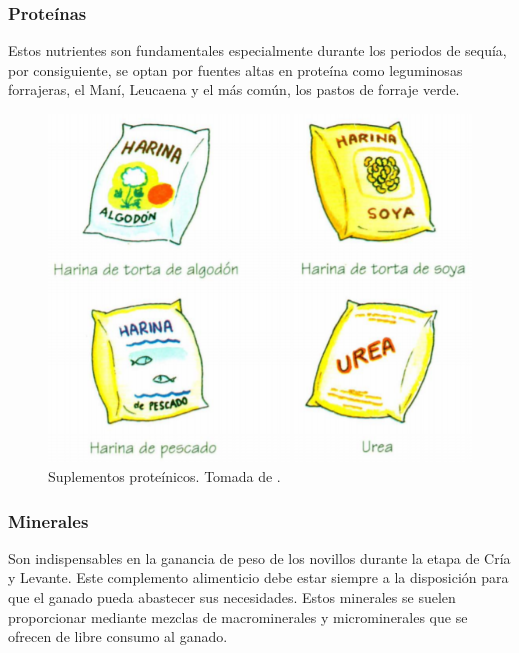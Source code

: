 \subsubsection{Proteínas}
Estos nutrientes son fundamentales especialmente durante los periodos de sequía, por consiguiente, se optan por fuentes altas en proteína como leguminosas forrajeras, el Maní, Leucaena y el más común, los pastos de forraje verde. 
	\begin{figure}[H]
	 \begin{center}
	 \includegraphics[scale=0.8]{img/proteina.png}
	 \end{center}
	 \caption{Suplementos proteínicos. Tomada de \cite{librito1}. \label{proteinaspng}}
	\end{figure}

\subsubsection{Minerales}
Son indispensables en la ganancia de peso de los novillos durante la etapa de Cría y Levante. Este complemento alimenticio debe estar siempre a la disposición para que el ganado pueda abastecer sus necesidades. Estos minerales se suelen proporcionar mediante mezclas de macrominerales y microminerales que se ofrecen de libre consumo al ganado.

